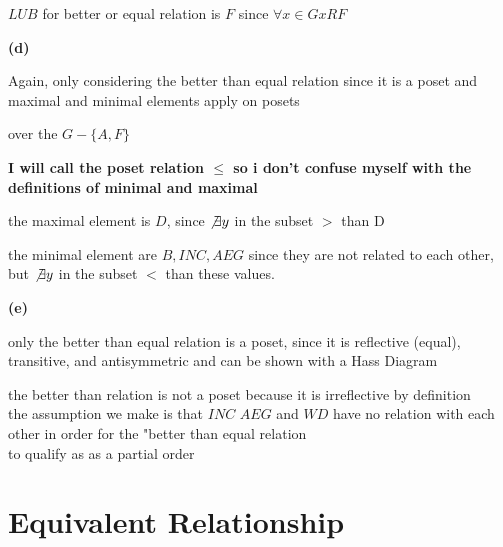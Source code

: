 \documentclass[12pts,A4]{article}
\begin{document}
\begin{flushleft}
    $LUB$ for better or equal relation is $F$ since $\forall x \in G xRF$

    \textbf{(d)}
    
    Again, only considering the better than equal relation since it is a poset and maximal and minimal elements apply on posets

    over the $G - \{A, F\} $ 

    \textbf{I will call the poset relation $\leq$ so i don't confuse myself with the definitions of minimal and maximal}
    
    the maximal element is $D$, since $\not\exists y$ in the subset $>$ than D

    the minimal element are $B, INC, AEG$ since they are not related to each other, but $\not\exists y$ in the subset $<$ than these values.
    
    \bigskip

    \bigskip

    \textbf{(e)}

    only the better than equal relation is a poset, since it is reflective (equal), transitive, and antisymmetric and can be shown with a Hass Diagram

    the better than relation is not a poset because it is irreflective by definition\\
    \bigskip
    the assumption we make is that $INC$ $AEG$ and $WD$ have no relation with each other in order for the "better than equal relation\\
    to qualify as as a partial order
    
\end{flushleft}

\section{Equivalent Relationship}
\end{document}
